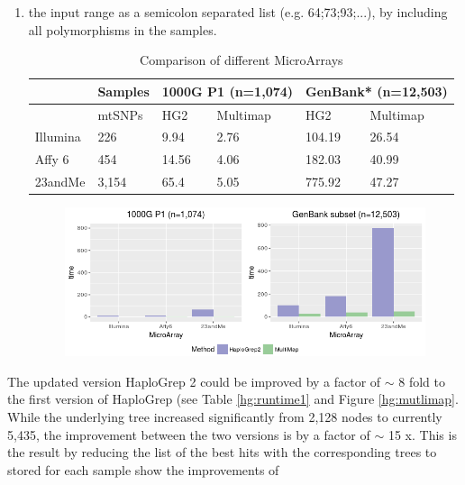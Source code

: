 \begin{enumerate}[label=(\alph*)]
\item  the input range as a semicolon separated list (e.g. 64;73;93;...), by including all polymorphisms in the samples. 

\begin{table}[H]
\centering
\caption{Comparison of different MicroArrays}
\label{hg:}
\begin{tabular}{ll|l|l|l|l|}
\cline{3-6}
                               & Samples & \multicolumn{2}{l|}{1000G P1 (n=1,074)} & \multicolumn{2}{l|}{GenBank* (n=12,503)} \\ \hline
\multicolumn{1}{|l|}{}         & mtSNPs  & HG2               & Multimap            & HG2              & Multimap           \\ \hline
\multicolumn{1}{|l|}{Illumina} & 226     & 9.94              & 2.76                & 104.19           & 26.54              \\ \hline
\multicolumn{1}{|l|}{Affy 6}   & 454     & 14.56             & 4.06                & 182.03           & 40.99              \\ \hline
\multicolumn{1}{|l|}{23andMe}  & 3,154   & 65.4              & 5.05                & 775.92           &       47.27             \\ \hline
\end{tabular}
\end{table}
\begin{figure}[!ht]
    \centering
    \includegraphics[width=1\textwidth]{images/multimap2.png}
    \caption[Run time comparison of HaploGrep versions]{} 
    \label{hg:multimap2}
\end{figure}
\end{enumerate}

The updated version HaploGrep 2 could be improved by a factor of $\sim$ 8 fold to the first version of HaploGrep (see Table \ref{hg:runtime1} and Figure \ref{hg:mutlimap}. While the underlying tree increased significantly from 2,128 nodes to currently 5,435, the improvement between the two versions is by a factor of $\sim$ 15 x. This is the result by reducing the list of the best hits with the corresponding trees to stored for each sample   show the improvements of 

